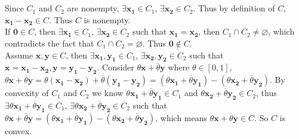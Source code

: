 \documentclass[12pt,letterpaper]{article}
\begin{document}
\section{}
Since $C_{1}$ and $C_{2}$ are nonempty, $\exists \boldsymbol{x_{1}}\in C_{1}$, $\exists \boldsymbol{x_{2}}\in C_{2}$. Thus by definition of $C$, $\boldsymbol{x_{1}}-\boldsymbol{x_{2}}\in C$. Thus $C$ is nonempty.\\
If $\boldsymbol{0}\in C$, then $\exists \boldsymbol{x_{1}}\in C_{1}$, $\exists \boldsymbol{x_{2}}\in C_{2}$ such that $\boldsymbol{{x}_{1}}=\boldsymbol{{x}_{2}}$, then $C_{1}\cap C_{2}\neq \varnothing$, which contradicts the fact that $C_{1}\cap C_{2}=\varnothing$. Thus $\boldsymbol{0}\notin C$.\\
Assume $\boldsymbol{x},\boldsymbol{y}\in C$, then $\exists \boldsymbol{x_{1}},\boldsymbol{y_{1}}\in C_{1}$, $\exists \boldsymbol{x_{2}},\boldsymbol{y_{2}}\in C_{2}$ such that $\boldsymbol{x}=\boldsymbol{x_{1}}-\boldsymbol{x_{2}},\boldsymbol{y}=\boldsymbol{y_{1}}-\boldsymbol{y_{2}}$. Consider $\theta \boldsymbol{x}+\overline{\theta}\boldsymbol{y}$ where $\theta\in [0,1]$, $\theta \boldsymbol{x}+\overline{\theta}\boldsymbol{y}=\theta(\boldsymbol{x_{1}}-\boldsymbol{x_{2}})+\overline{\theta}(\boldsymbol{y_{1}}-\boldsymbol{y_{2}})=(\theta\boldsymbol{x_{1}}+\overline{\theta}\boldsymbol{y_{1}})-(\theta\boldsymbol{x_{2}}+\overline{\theta}\boldsymbol{y_{2}})$. By convexity of $C_{1}$ and $C_{2}$ we know $\theta\boldsymbol{x_{1}}+\overline{\theta}\boldsymbol{y_{1}}\in C_{1}$ and $\theta\boldsymbol{x_{2}}+\overline{\theta}\boldsymbol{y_{2}}\in C_{2}$, thus $\exists \theta\boldsymbol{x_{1}}+\overline{\theta}\boldsymbol{y_{1}}\in C_{1}$, $\exists \theta\boldsymbol{x_{2}}+\overline{\theta}\boldsymbol{y_{2}}\in C_{2}$ such that $\theta \boldsymbol{x}+\overline{\theta}\boldsymbol{y}=(\theta\boldsymbol{x_{1}}+\overline{\theta}\boldsymbol{y_{1}})-(\theta\boldsymbol{x_{2}}+\overline{\theta}\boldsymbol{y_{2}})$, which means $\theta \boldsymbol{x}+\overline{\theta}\boldsymbol{y}\in C$. So $C$ is convex.

\section{}
\end{document}
